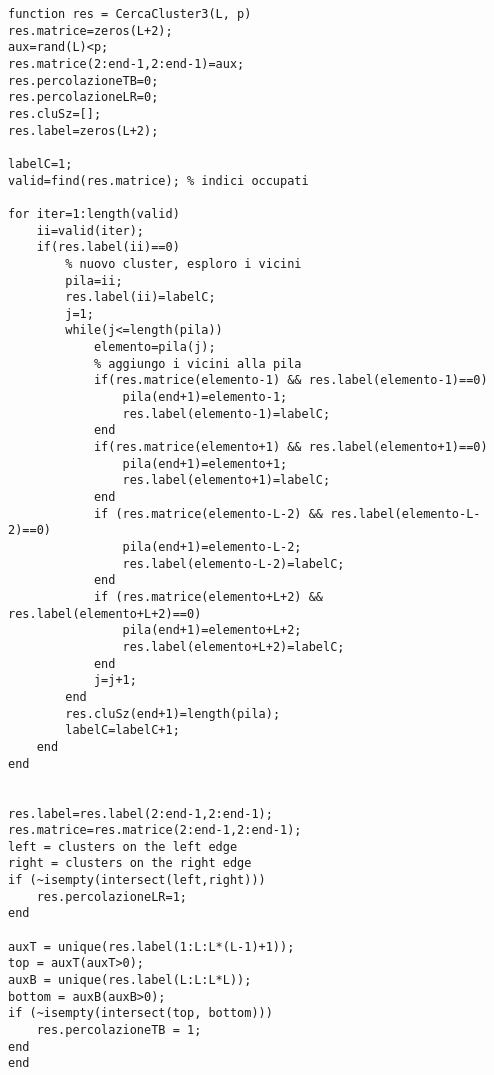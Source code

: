 \begin{lstlisting}[caption={Algoritmo standard di cluster-finding}, label={cod:cluster-finding}]
function res = CercaCluster3(L, p)
res.matrice=zeros(L+2);
aux=rand(L)<p;
res.matrice(2:end-1,2:end-1)=aux;
res.percolazioneTB=0;
res.percolazioneLR=0;
res.cluSz=[];
res.label=zeros(L+2);

labelC=1;
valid=find(res.matrice); % indici occupati

for iter=1:length(valid)
    ii=valid(iter);
    if(res.label(ii)==0)
        % nuovo cluster, esploro i vicini
        pila=ii;
        res.label(ii)=labelC;
        j=1;
        while(j<=length(pila))
            elemento=pila(j);
            % aggiungo i vicini alla pila
            if(res.matrice(elemento-1) && res.label(elemento-1)==0)
                pila(end+1)=elemento-1;
                res.label(elemento-1)=labelC;
            end
            if(res.matrice(elemento+1) && res.label(elemento+1)==0)
                pila(end+1)=elemento+1;
                res.label(elemento+1)=labelC;
            end
            if (res.matrice(elemento-L-2) && res.label(elemento-L-2)==0)
                pila(end+1)=elemento-L-2;
                res.label(elemento-L-2)=labelC;
            end
            if (res.matrice(elemento+L+2) && res.label(elemento+L+2)==0)
                pila(end+1)=elemento+L+2;
                res.label(elemento+L+2)=labelC;
            end
            j=j+1;
        end
        res.cluSz(end+1)=length(pila); 
        labelC=labelC+1;
    end
end


res.label=res.label(2:end-1,2:end-1);
res.matrice=res.matrice(2:end-1,2:end-1);
left = clusters on the left edge
right = clusters on the right edge
if (~isempty(intersect(left,right)))
    res.percolazioneLR=1;
end

auxT = unique(res.label(1:L:L*(L-1)+1));
top = auxT(auxT>0);
auxB = unique(res.label(L:L:L*L));
bottom = auxB(auxB>0);
if (~isempty(intersect(top, bottom)))
    res.percolazioneTB = 1;
end
end
\end{lstlisting}